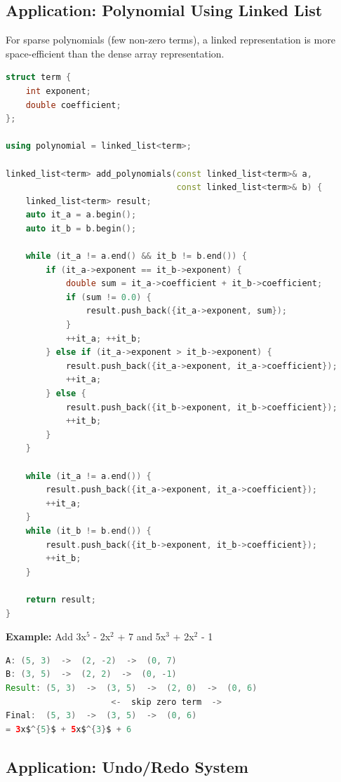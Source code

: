 \subsection{Application: Polynomial Using Linked List}

For sparse polynomials (few non-zero terms), a linked representation is more space-efficient than the dense array representation.

\begin{lstlisting}[language=C++]
struct term {
    int exponent;
    double coefficient;
};

using polynomial = linked_list<term>;

linked_list<term> add_polynomials(const linked_list<term>& a,
                                  const linked_list<term>& b) {
    linked_list<term> result;
    auto it_a = a.begin();
    auto it_b = b.begin();

    while (it_a != a.end() && it_b != b.end()) {
        if (it_a->exponent == it_b->exponent) {
            double sum = it_a->coefficient + it_b->coefficient;
            if (sum != 0.0) {
                result.push_back({it_a->exponent, sum});
            }
            ++it_a; ++it_b;
        } else if (it_a->exponent > it_b->exponent) {
            result.push_back({it_a->exponent, it_a->coefficient});
            ++it_a;
        } else {
            result.push_back({it_b->exponent, it_b->coefficient});
            ++it_b;
        }
    }

    while (it_a != a.end()) {
        result.push_back({it_a->exponent, it_a->coefficient});
        ++it_a;
    }
    while (it_b != b.end()) {
        result.push_back({it_b->exponent, it_b->coefficient});
        ++it_b;
    }

    return result;
}
\end{lstlisting}

\textbf{Example:} Add 3x$^{5}$ - 2x$^{2}$ + 7 and 5x$^{3}$ + 2x$^{2}$ - 1
\begin{lstlisting}[language=Java]
A: (5, 3)  ->  (2, -2)  ->  (0, 7)
B: (3, 5)  ->  (2, 2)  ->  (0, -1)
Result: (5, 3)  ->  (3, 5)  ->  (2, 0)  ->  (0, 6)
                     <-  skip zero term  -> 
Final:  (5, 3)  ->  (3, 5)  ->  (0, 6)
= 3x$^{5}$ + 5x$^{3}$ + 6
\end{lstlisting}

\subsection{Application: Undo/Redo System}


